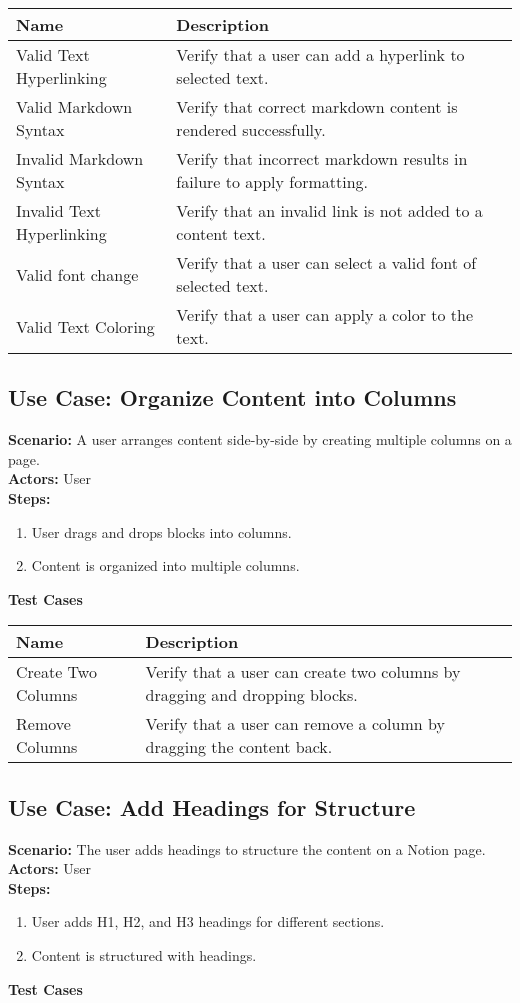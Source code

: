 \documentclass{article}
\begin{document}
            \begin{longtable}{|p{}|p{}|}
            \hline
            \textbf{Name} & \textbf{Description} \\
            \hline
            Valid Text Hyperlinking & Verify that a user can add a hyperlink to selected text. \\
\hline
Valid Markdown Syntax & Verify that correct markdown content is rendered successfully. \\
\hline
Invalid Markdown Syntax & Verify that incorrect markdown results in failure to apply formatting. \\
\hline
Invalid Text Hyperlinking & Verify that an invalid link is not added to a content text. \\
\hline
Valid font change & Verify that a user can select a valid font of selected text. \\
\hline
Valid Text Coloring & Verify that a user can apply a color to the text. \\
\hline
\end{longtable}\subsection{\textbf{Use Case: Organize Content into Columns}}
\textbf{Scenario:} A user arranges content side-by-side by creating multiple columns on a page.\\
\textbf{Actors:} User\\
\textbf{Steps:}
\begin{enumerate}
\item User drags and drops blocks into columns.
\item Content is organized into multiple columns.
\end{enumerate}
\textbf{Test Cases}

            \begin{longtable}{|p{}|p{}|}
            \hline
            \textbf{Name} & \textbf{Description} \\
            \hline
            Create Two Columns & Verify that a user can create two columns by dragging and dropping blocks. \\
\hline
Remove Columns & Verify that a user can remove a column by dragging the content back. \\
\hline
\end{longtable}\subsection{\textbf{Use Case: Add Headings for Structure}}
\textbf{Scenario:} The user adds headings to structure the content on a Notion page.\\
\textbf{Actors:} User\\
\textbf{Steps:}
\begin{enumerate}
\item User adds H1, H2, and H3 headings for different sections.
\item Content is structured with headings.
\end{enumerate}
\textbf{Test Cases}
\end{document}
